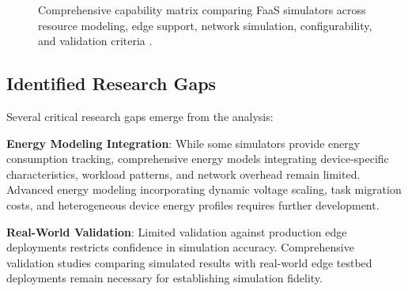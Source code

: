\begin{figure}[htbp]
\centering
{}
\caption{Comprehensive capability matrix comparing FaaS simulators across resource modeling, edge support, network simulation, configurability, and validation criteria \cite{boughzala2022faassim, das2022serverlesssimpro, li2022edgefaas, mahmoudi2021simfaas, bermbach2019mfs, mampage2021cloudsimsc}.}
\label{fig:simulator-capability-matrix}
\end{figure}


\subsection{Identified Research Gaps}

Several critical research gaps emerge from the analysis:

\textbf{Energy Modeling Integration}: While some simulators provide energy consumption tracking, comprehensive energy models integrating device-specific characteristics, workload patterns, and network overhead remain limited. Advanced energy modeling incorporating dynamic voltage scaling, task migration costs, and heterogeneous device energy profiles requires further development.

\textbf{Real-World Validation}: Limited validation against production edge deployments restricts confidence in simulation accuracy. Comprehensive validation studies comparing simulated results with real-world edge testbed deployments remain necessary for establishing simulation fidelity.

